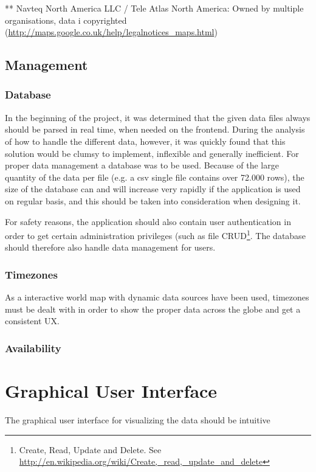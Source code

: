 ** Navteq North America LLC / Tele Atlas North America: Owned by multiple organisations, data i copyrighted (\url{http://maps.google.co.uk/help/legalnotices_maps.html})

\subsection{Management}

\subsubsection{Database}
In the beginning of the project, it was determined that the given data files always should be parsed in real time, when needed on the frontend. During the analysis of how to handle the different data, however, it was quickly found that this solution would be clumsy to implement, inflexible and generally inefficient.
For proper data management a database was to be used. Because of the large quantity of the data per file (e.g. a csv single file contains over 72.000 rows), the size of the database can and will increase very rapidly if the application is used on regular basis, and this should be taken into consideration when designing it.

For safety reasons, the application should also contain user authentication in order to get certain administration privileges (such as file CRUD\footnote{Create, Read, Update and Delete. See \url{http://en.wikipedia.org/wiki/Create,_read,_update_and_delete}}. The database should therefore also handle data management for users.

\subsubsection{Timezones}
As a interactive world map with dynamic data sources have been used, timezones must be dealt with in order to show the proper data across the globe and get a consistent UX.

\subsubsection{Availability}

\section{Graphical User Interface}
The graphical user interface for visualizing the data should be intuitive
